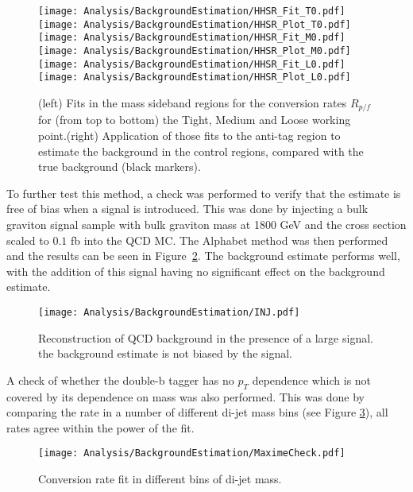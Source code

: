 \begin{figure}[H]
\centering
\texttt{[image: Analysis/BackgroundEstimation/HHSR\_Fit\_T0.pdf]}
\texttt{[image: Analysis/BackgroundEstimation/HHSR\_Plot\_T0.pdf]}
\texttt{[image: Analysis/BackgroundEstimation/HHSR\_Fit\_M0.pdf]}
\texttt{[image: Analysis/BackgroundEstimation/HHSR\_Plot\_M0.pdf]}
\texttt{[image: Analysis/BackgroundEstimation/HHSR\_Fit\_L0.pdf]}
\texttt{[image: Analysis/BackgroundEstimation/HHSR\_Plot\_L0.pdf]}
\caption{(left) Fits in the mass sideband regions for the conversion rates $R_{p/f}$ for (from top to bottom) the Tight, Medium and Loose working point.(right) Application of those fits to the anti-tag region to estimate the background in the control regions, compared with the true background (black markers).}
\label{F:closuredata}
\end{figure}

To further test this method, a check was performed to verify that the estimate is free of bias when a signal is introduced. This was done by injecting a bulk graviton signal sample with bulk graviton mass at 1800 GeV and the cross section scaled to $0.1$ fb into the QCD MC. The Alphabet method was then performed and the results can be seen in Figure~\ref{fig:INJ}. The background estimate performs well, with the addition of this signal having no significant effect on the background estimate.

\begin{figure}[H]
  \centering
    \texttt{[image: Analysis/BackgroundEstimation/INJ.pdf]}
  \caption{Reconstruction of QCD background in the presence of a large signal. the background estimate is not biased by the signal.} \label{fig:INJ}
\end{figure}

A check of whether the double-b tagger has no $p_T$ dependence which is not covered by its dependence on mass was also performed. This was done by comparing the rate in a number of different di-jet mass bins (see Figure \ref{F:INJ2}), all rates agree within the power of the fit.

\begin{figure}[H]
  \centering
    \texttt{[image: Analysis/BackgroundEstimation/MaximeCheck.pdf]}
  \caption{Conversion rate fit in different bins of di-jet mass.} \label{F:INJ2}
\end{figure}

